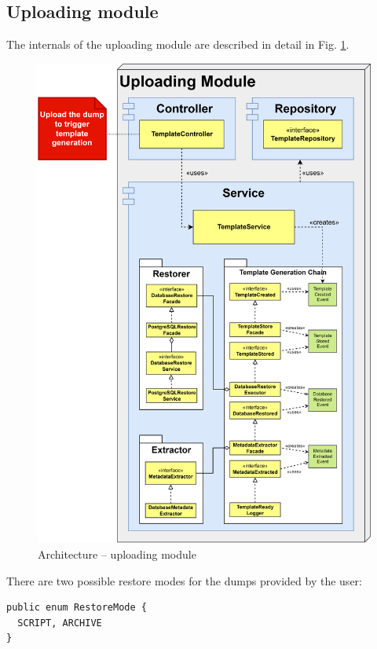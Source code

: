 \documentclass[a4paper,twoside,12pt]{book}
\begin{document}
\subsection{Uploading module}

The internals of the uploading module are described in detail in  Fig. \ref{fig:architecture_uploading}.
%
\begin{figure}
  \centering
  \includegraphics[width=\linewidth]{img/architecture_uploading.png}
  \caption{Architecture – uploading module}
  \label{fig:architecture_uploading}
\end{figure}
%
%
There are two possible restore modes for the dumps provided by the user:
\begin{verbatim}
public enum RestoreMode {
  SCRIPT, ARCHIVE
}
\end{verbatim}
\end{document}
